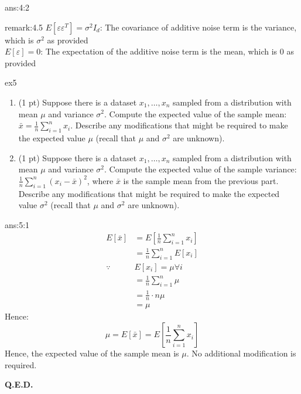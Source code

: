 \documentclass{tron}
\newcommand{\mref}[1]{\underline{\textbf{\hypersetup{linkcolor=orange}\Cref{#1}\hypersetup{linkcolor=blue}}}}
\begin{document}
\begin{answer}[]{ans:4:2}
	\begin{remark}{remark:4.5}
		$E[\varepsilon \varepsilon^T] = \sigma^2 I_d$: The covariance of additive noise term is the variance, which is $\sigma^2$ as provided \\
		$E[\varepsilon] = 0 $: The expectation of the additive noise term is the mean, which is 0 as provided
	\end{remark}

\end{answer}

\newpage
\setcounter{section}{5}
\begin{exercise}{ex5}
  \begin{enumerate}
  \item (1 pt) Suppose there is a dataset $x_1, \dots, x_n$ sampled from a distribution with mean $\mu$ and variance $\sigma^2$.
    Compute the expected value of the sample mean: $\bar x = \frac{1}{n} \sum_{i=1}^n x_i$. 
    Describe any modifications that might be required to make the expected value $\mu$ (recall that $\mu$ and $\sigma^2$ are unknown). 

    \ans{\mref{ans:5:1}}
  \item (1 pt) Suppose there is a dataset $x_1, \dots, x_n$ sampled from a distribution with mean $\mu$ and variance $\sigma^2$.
    Compute the expected value of the sample variance: $\frac{1}{n} \sum_{i=1}^n \left(x_i - \bar x \right)^2$, where $\bar x$ is the sample mean from the previous part.
    Describe any modifications that might be required to make the expected value $\sigma^2$ (recall that $\mu$ and $\sigma^2$ are unknown). 
    
    \ans{\mref{ans:5:2}} 
\end{enumerate}
\end{exercise}
\setcounter{answer}{0}
\begin{answer}[]{ans:5:1}
	\begin{align}
		E[\bar{x}] 
			&= E\left[ \frac1n \sum_{i=1}^n x_i \right] \\
			&= \frac1n \sum_{i=1}^n E\left[ x_i \right] \\
		\because \quad & E[x_i] = \mu \forall i \\
			&= \frac1n \sum_{i=1}^n \mu \\
			&= \frac1n \cdot n \mu \\
			&= \mu
	\end{align}
	Hence:
	\begin{equation}
		\mu = E[\bar{x}] = E\left[ \frac1n \sum_{i=1}^n x_i \right]
	\end{equation}
	Hence, the expected value of the sample mean is $\mu$. No additional modification is required.

	\textbf{Q.E.D.}
\end{answer}
\end{document}
